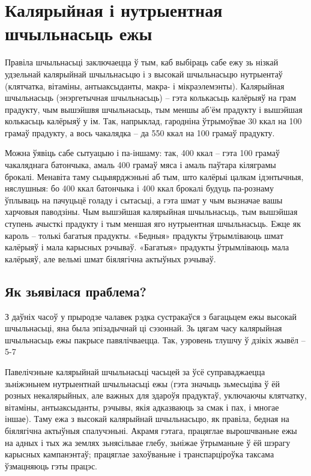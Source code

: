 \chapter{Калярыйная і нутрыентная шчыльнасьць ежы}

Правіла шчыльнасьці заключаецца ў тым, каб выбіраць сабе ежу зь нізкай удзельнай калярыйнай шчыльнасьцю і з высокай шчыльнасьцю нутрыентаў (клятчатка, вітаміны, антыаксыданты, макра- і мікраэлемэнты). Калярыйная шчыльнасьць (энэргетычная шчыльнасьць) – гэта колькасьць калёрыяў на грам прадукту, чым вышэйшвя шчыльнасьць, тым меншы аб'ём прадукту і вышэйшая колькасьць калёрыяў у ім. Так, напрыклад, гародніна ўтрымоўвае 30 ккал на 100 грамаў прадукту, а вось чакалядка – да 550 ккал на 100 грамаў прадукту.

Можна ўявіць сабе сытуацыю і па-іншаму: так, 400 ккал – гэта 100 грамаў чакаляднага батончыка, амаль 400 грамаў мяса і амаль паўтара кіляграмы брокалі. Менавіта таму сьцьвярджэньні аб тым, што калёрыі цалкам ідэнтычныя, няслушныя: бо 400 ккал батончыка і 400 ккал брокалі будуць па-рознаму ўплываць на пачуцьцё голаду і сытасьці, а гэта шмат у чым вызначае вашы харчовыя паводзіны. Чым вышэйшая калярыйная шчыльнасьць, тым вышэйшая ступень ачысткі прадукту і тым меншая яго нутрыентная шчыльнасьць. Ежце як кароль – толькі багатыя прадукты. «Бедныя» прадукты ўтрымліваюць шмат калёрыяў і мала карысных рэчываў. «Багатыя» прадукты ўтрымліваюць мала калёрыяў, але вельмі шмат біялягічна актыўных рэчываў.

\section{Як зьявілася праблема?}

З даўніх часоў у прыродзе чалавек рэдка сустракаўся з багацьцем ежы высокай шчыльнасьці, яна была эпізадычнай ці сэзоннай. Зь цягам часу калярыйная шчыльнасьць ежы пакрысе павялічваецца. Так, узровень тлушчу ў дзікіх жывёл – 5-7%

Павелічэньне калярыйнай шчыльнасьці часьцей за ўсё суправаджаецца зьніжэньнем нутрыентнай шчыльнасьці ежы (гэта значыць зьмесьціва ў ёй розных некалярыйных, але важных для здароўя прадуктаў, уключаючы клятчатку, вітаміны, антыаксыданты, рэчывы, якія адказваюць за смак і пах, і многае іншае). Таму ежа з высокай калярыйнай шчыльнасьцю, як правіла, бедная на біялягічна актыўныя спалучэньні. Акрамя гэтага, працяглае вырошчваньне ежы на адных і тых жа землях зьнясільвае глебу, зьніжае ўтрыманьне ў ёй шэрагу карысных кампанэнтаў; працяглае захоўваньне і транспарціроўка таксама ўзмацняюць гэты працэс.

